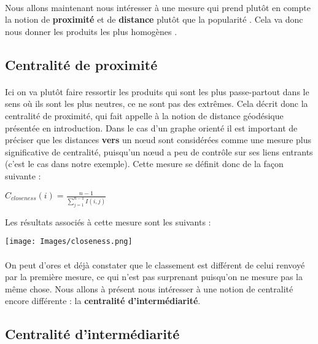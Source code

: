 \documentclass[14pt, openany]{article}
\begin{document}
\paragraph{}
Nous allons maintenant nous intéresser à une mesure qui prend plutôt en compte la notion de \textbf{proximité} et de \textbf{distance} plutôt que la \og popularité \fg{}. Cela va donc nous donner les produits les plus \og homogènes \fg{}. 
\subsection{Centralité de proximité}
\paragraph{}
Ici on va plutôt faire ressortir les produits qui sont les plus \og passe-partout \fg{} dans le sens où ils sont les plus neutres, ce ne sont pas des extrêmes. Cela décrit donc la centralité de proximité, qui fait appelle à la notion de distance géodésique présentée en introduction. Dans le cas d'un graphe orienté il est important de préciser que les distances \textbf{vers} un nœud sont considérées comme une mesure plus significative de centralité, puisqu'un nœud a peu de contrôle sur ses liens
entrants (c'est le cas dans notre exemple). Cette mesure se définit donc de la façon suivante :\\
\begin{center}
$C_{closeness}(i)=\frac{n-1}{\sum\limits_{j=1}^{n-1}I(i,j)} $
\end{center}
Les résultats associés à cette mesure sont les suivants :
\begin{center}
\texttt{[image: Images/closeness.png]}
\label{fig1}
\end{center}
\paragraph{}
On peut d'ores et déjà constater que le classement est différent de celui renvoyé par la première mesure, ce qui n'est pas surprenant puisqu'on ne mesure pas la même chose. Nous allons à présent nous intéresser à une notion de centralité encore différente : la \textbf{centralité d'intermédiarité}.
\subsection{Centralité d'intermédiarité}
\end{document}
